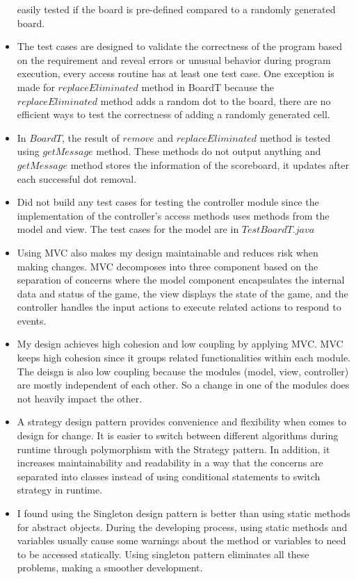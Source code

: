 \documentclass[12pt]{article}
\begin{document}
\begin{itemize}
        easily tested if the board is pre-defined compared to a randomly generated board.
  \item The test cases are designed to validate the correctness of the program based on the requirement and reveal errors
        or unusual behavior during program execution, every access routine has at least one test case. One exception is
        made for $replaceEliminated$ method in BoardT because the $replaceEliminated$ method adds a random dot to the board, 
        there are no efficient ways to test the correctness of adding a randomly generated cell.
  \item In $BoardT$, the result of $remove$ and $replaceEliminated$ method is tested using $getMessage$ method. These methods do
        not output anything and $getMessage$ method stores the information of the scoreboard, it updates after each successful dot removal.
  \item Did not build any test cases for testing the controller module since the implementation of the controller's access methods uses 
        methods from the model and view. The test cases for the model are in $TestBoardT.java$
  \item Using MVC also makes my design maintainable and reduces risk when making changes. MVC decomposes into three 
        component based on the separation of concerns where the model component encapsulates the internal 
        data and status of the game, the view displays the state of the game, and the controller handles
        the input actions to execute related actions to respond to events.
  \item My design achieves high cohesion and low coupling by applying MVC. MVC keeps high cohesion since
        it groups related functionalities within each module. The deisgn is also low coupling because
        the modules (model, view, controller) are mostly independent of each other. So a change in one of the
        modules does not heavily impact the other.
  \item A strategy design pattern provides convenience and flexibility when comes to design for change. It is easier to switch
        between different algorithms during runtime through polymorphism with the Strategy pattern. In addition, it increases
        maintainability and readability in a way that the concerns are separated into classes instead of using
        conditional statements to switch strategy in runtime.
  \item I found using the Singleton design pattern is better than using static methods for abstract objects. During the developing process, using 
        static methods and variables usually cause some warnings about the method or variables to need to be accessed statically. Using singleton
        pattern eliminates all these problems, making a smoother development.
  
\end{itemize}
\end{document}
